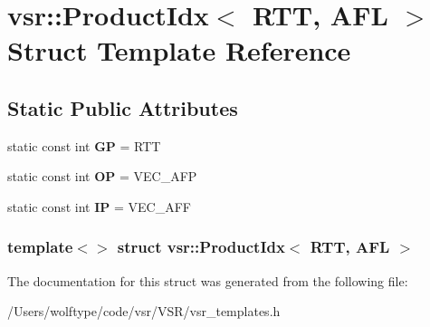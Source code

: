 \hypertarget{structvsr_1_1_product_idx_3_01_r_t_t_00_01_a_f_l_01_4}{\section{vsr\-:\-:Product\-Idx$<$ R\-T\-T, A\-F\-L $>$ Struct Template Reference}
\label{structvsr_1_1_product_idx_3_01_r_t_t_00_01_a_f_l_01_4}
}
\subsection*{Static Public Attributes}
\begin{DoxyCompactItemize}
\item 
\hypertarget{structvsr_1_1_product_idx_3_01_r_t_t_00_01_a_f_l_01_4_ae743ced477439b6f5ddd710663778f97}{static const int {\bfseries G\-P} = R\-T\-T}\label{structvsr_1_1_product_idx_3_01_r_t_t_00_01_a_f_l_01_4_ae743ced477439b6f5ddd710663778f97}

\item 
\hypertarget{structvsr_1_1_product_idx_3_01_r_t_t_00_01_a_f_l_01_4_a04b0796a4f871b123de652778a589105}{static const int {\bfseries O\-P} = V\-E\-C\-\_\-\-A\-F\-P}\label{structvsr_1_1_product_idx_3_01_r_t_t_00_01_a_f_l_01_4_a04b0796a4f871b123de652778a589105}

\item 
\hypertarget{structvsr_1_1_product_idx_3_01_r_t_t_00_01_a_f_l_01_4_ab8e541340e04f37dfa5ffc2fc042f867}{static const int {\bfseries I\-P} = V\-E\-C\-\_\-\-A\-F\-F}\label{structvsr_1_1_product_idx_3_01_r_t_t_00_01_a_f_l_01_4_ab8e541340e04f37dfa5ffc2fc042f867}

\end{DoxyCompactItemize}
\subsubsection*{template$<$$>$ struct vsr\-::\-Product\-Idx$<$ R\-T\-T, A\-F\-L $>$}



The documentation for this struct was generated from the following file\-:\begin{DoxyCompactItemize}
\item 
/\-Users/wolftype/code/vsr/\-V\-S\-R/vsr\-\_\-templates.\-h\end{DoxyCompactItemize}
